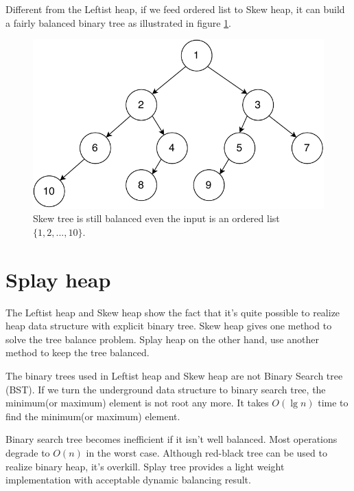 \documentclass[b5paper]{article}
\begin{document}
Different from the Leftist heap, if we feed ordered list to Skew heap, it can build a
fairly balanced binary tree as illustrated in figure \ref{fig:skew-tree}.

\begin{figure}[htbp]
   \begin{center}
   	  \includegraphics[scale=0.5]{img/skew-tree}
    \caption{Skew tree is still balanced even the input is an ordered list $\{1, 2, ..., 10\}$.}
    \label{fig:skew-tree}
   \end{center}
\end{figure}



\section{Splay heap}
\label{splayheap}

The Leftist heap and Skew heap show the fact that it's quite possible to realize
heap data structure with explicit binary tree.
Skew heap gives one method to solve the tree balance problem. Splay heap
on the other hand, use another method to keep the tree balanced.

The binary trees used in Leftist heap and Skew heap
are not Binary Search tree (BST). If we turn the underground
data structure to binary search tree, the minimum(or maximum)
element is not root any more. It takes $O(\lg n)$ time
to find the minimum(or maximum) element.

Binary search tree becomes inefficient if it isn't well
balanced. Most operations degrade to $O(n)$ in the worst case.
Although red-black tree can be used to realize
binary heap, it's overkill. Splay tree provides a light weight
implementation with acceptable dynamic balancing result.
\end{document}
